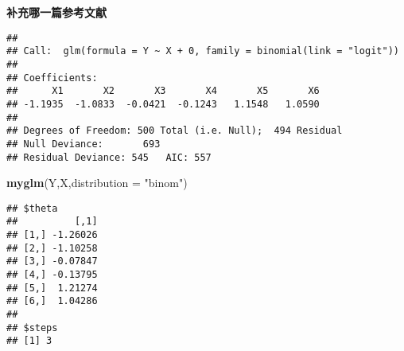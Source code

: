 \documentclass[]{ctexbook}
\newenvironment{Shaded}{\begin{snugshade}}{\end{snugshade}}
\newcommand{\CommentTok}[1]{\textcolor[rgb]{0.56,0.35,0.01}{\textit{#1}}}
\newcommand{\DataTypeTok}[1]{\textcolor[rgb]{0.13,0.29,0.53}{#1}}
\newcommand{\DecValTok}[1]{\textcolor[rgb]{0.00,0.00,0.81}{#1}}
\newcommand{\KeywordTok}[1]{\textcolor[rgb]{0.13,0.29,0.53}{\textbf{#1}}}
\newcommand{\NormalTok}[1]{#1}
\newcommand{\OperatorTok}[1]{\textcolor[rgb]{0.81,0.36,0.00}{\textbf{#1}}}
\newcommand{\StringTok}[1]{\textcolor[rgb]{0.31,0.60,0.02}{#1}}
\begin{document}
\textbf{补充哪一篇参考文献}

\begin{Shaded}
\end{Shaded}

\begin{verbatim}
## 
## Call:  glm(formula = Y ~ X + 0, family = binomial(link = "logit"))
## 
## Coefficients:
##      X1       X2       X3       X4       X5       X6  
## -1.1935  -1.0833  -0.0421  -0.1243   1.1548   1.0590  
## 
## Degrees of Freedom: 500 Total (i.e. Null);  494 Residual
## Null Deviance:       693 
## Residual Deviance: 545   AIC: 557
\end{verbatim}

\begin{Shaded}
\begin{Highlighting}[]
\KeywordTok{myglm}\NormalTok{(Y,X,}\DataTypeTok{distribution  =} \StringTok{"binom"}\NormalTok{)}
\end{Highlighting}
\end{Shaded}

\begin{verbatim}
## $theta
##          [,1]
## [1,] -1.26026
## [2,] -1.10258
## [3,] -0.07847
## [4,] -0.13795
## [5,]  1.21274
## [6,]  1.04286
## 
## $steps
## [1] 3
\end{verbatim}
\end{document}
